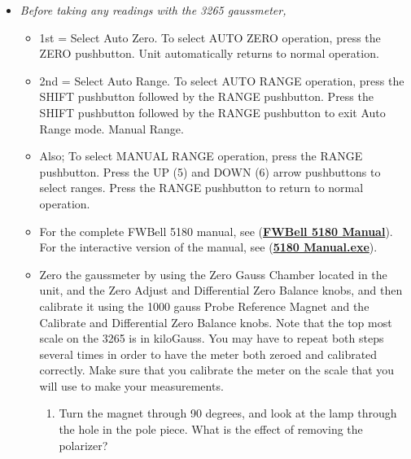 \documentclass{../lab}
\begin{document}
\begin{enumerate}
    \begin{itemize}
        \item \emph{Before taking any readings with the 3265 gaussmeter,}
        \begin{itemize}
            \item 1st = Select Auto Zero. To select AUTO ZERO operation, press the ZERO pushbutton. Unit automatically returns to normal operation.
        
            \item 2nd = Select Auto Range. To select AUTO RANGE operation, press the SHIFT pushbutton followed by the RANGE pushbutton. Press the SHIFT pushbutton followed by the RANGE pushbutton to exit Auto Range mode. Manual Range.
            
            \item Also; To select MANUAL RANGE operation, press the RANGE pushbutton. Press the UP (5) and DOWN (6) arrow pushbuttons to select ranges. Press the RANGE pushbutton to return to normal operation.
            
            \item For the complete FWBell 5180 manual, see (\href{https://drive.google.com/file/d/1hIz7hW4KIF7obkdW_PdeqojFywvVudIo/view?usp=drive_link}{\textbf{FWBell 5180 Manual}}). For the interactive version of the manual, see (\href{https://drive.google.com/file/d/1eWtzg8VQH2-WOXjMPfXGIpShMBBnDoRg/view?usp=drive_link}{\textbf{5180 Manual.exe}}).
            
            \item Zero the gaussmeter by using the Zero Gauss Chamber located in the unit, and the Zero Adjust and Differential Zero Balance knobs, and then calibrate it using the 1000 gauss Probe Reference Magnet and the Calibrate and Differential Zero Balance knobs. Note that the top most scale on the 3265 is in kiloGauss. You may have to repeat both steps several times in order to have the meter both zeroed and calibrated correctly. Make sure that you calibrate the meter on the scale that you will use to make your measurements.
            \begin{enumerate}
                \item Turn the magnet through 90 degrees, and look at the lamp through the hole in the pole piece. What is the effect of removing the polarizer?
            

\end{enumerate}
\end{itemize}
\end{itemize}
\end{enumerate}
\end{document}
